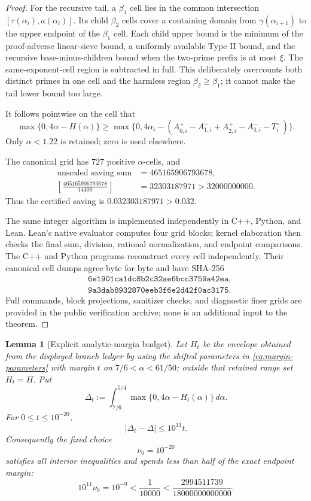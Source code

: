 \documentclass[10pt,reqno]{amsart}
\newcommand{\1}{\mathbf{1}}
\theoremstyle{plain}
\newtheorem{lemma}[theorem]{Lemma}
\theoremstyle{remark}
\begin{document}
\begin{proof}
For the recursive tail, a $\beta_1$ cell lies in the common intersection
$[\tau(\alpha_i),a(\alpha_i)]$.  Its child $\beta_2$ cells cover a containing
domain from $\gamma(\alpha_{i+1})$ to the upper endpoint of the
$\beta_1$ cell.  Each child upper bound is the minimum of the proof-adverse
linear-sieve bound, a uniformly available Type II bound, and the recursive
base-minus-children bound when the two-prime prefix is at most $\xi$.
The same-exponent-cell region is subtracted in full.  This deliberately
overcounts both distinct primes in one cell and the harmless region
$\beta_2\ge\beta_1$; it cannot make the tail lower bound too large.

It follows pointwise on the cell that
\[
 \max\{0,4\alpha-H(\alpha)\}
 \ge \max\{0,4\alpha_i-
 (A_{0,i}^{+}-A_{1,i}^{-}+A_{2,i}^{+}
   -A_{3,i}^{-}-T_i^{-})\}.
\]
Only $\alpha<1.22$ is retained; zero is used elsewhere.

The canonical grid has $727$ positive $\alpha$-cells, and
\[
 \begin{aligned}
 \text{unscaled saving sum}&=465165906793678,\\
 \left\lfloor\frac{465165906793678}{14400}\right\rfloor
 &=32303187971>32000000000.
 \end{aligned}
\]
Thus the certified saving is $0.032303187971>0.032$.

The same integer algorithm is implemented independently in C++, Python, and
Lean.  Lean's native evaluator computes four grid blocks; kernel elaboration
then checks the final sum, division, rational normalization, and endpoint
comparisons.  The C++ and Python programs reconstruct every cell independently.
Their canonical cell dumps agree byte for byte and have SHA-256
\[
 \begin{aligned}
 &\texttt{6e1901ca1dc8b2c32ae6bcc3759a42ea},\\
 &\texttt{9a3dab8932870eeb3f6e2d42f0ac3175}.
 \end{aligned}
\]
Full commands, block projections, sanitizer checks, and diagnostic finer
grids are provided in the public verification archive; none is an additional
input to the theorem.
\end{proof}

\begin{lemma}[Explicit analytic-margin budget]\label{lem:explicit-margin}
Let $H_t$ be the envelope obtained from the displayed branch ledger by
using the shifted parameters in \eqref{eq:margin-parameters} with margin
$t$ on $7/6<\alpha<61/50$; outside that retained range set $H_t=H$.  Put
\[
 \Delta_t:=\int_{7/6}^{5/4}\max\{0,4\alpha-H_t(\alpha)\}\,d\alpha.
\]
For $0\le t\le10^{-20}$,
\begin{equation}\label{eq:explicit-margin-loss}
 |\Delta_t-\Delta|\le10^{11}t.
\end{equation}
Consequently the fixed choice
\begin{equation}\label{eq:explicit-nu}
 \nu_0=10^{-20}
\end{equation}
satisfies all interior inequalities and spends less than half of the exact
endpoint margin:
\[
 10^{11}\nu_0=10^{-9}<\frac1{10000}
 <\frac{2994511739}{18000000000000}.
\]
\end{lemma}
\end{document}
